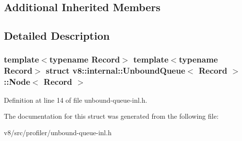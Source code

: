 \subsection*{Additional Inherited Members}


\subsection{Detailed Description}
\subsubsection*{template$<$typename Record$>$\newline
template$<$typename Record$>$\newline
struct v8\+::internal\+::\+Unbound\+Queue$<$ Record $>$\+::\+Node$<$ Record $>$}



Definition at line 14 of file unbound-\/queue-\/inl.\+h.



The documentation for this struct was generated from the following file\+:\begin{DoxyCompactItemize}
\item 
v8/src/profiler/unbound-\/queue-\/inl.\+h\end{DoxyCompactItemize}
